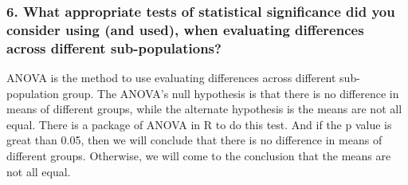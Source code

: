 \documentclass[
]{article}
\begin{document}
\hypertarget{what-appropriate-tests-of-statistical-significance-did-you-consider-using-and-used-when-evaluating-differences-across-different-sub-populations}{%
\subsubsection{6. What appropriate tests of statistical significance did
you consider using (and used), when evaluating differences across
different
sub-populations?}\label{what-appropriate-tests-of-statistical-significance-did-you-consider-using-and-used-when-evaluating-differences-across-different-sub-populations}}

ANOVA is the method to use evaluating differences across different
sub-population group. The ANOVA's null hypothesis is that there is no
difference in means of different groups, while the alternate hypothesis
is the means are not all equal. There is a package of ANOVA in R to do
this test. And if the p value is great than 0.05, then we will conclude
that there is no difference in means of different groups. Otherwise, we
will come to the conclusion that the means are not all equal.
\end{document}
